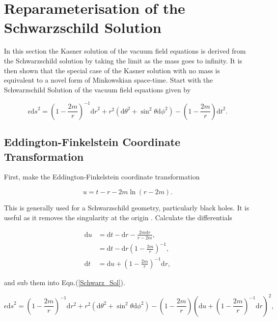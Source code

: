 \section{Reparameterisation of the Schwarzschild Solution}

In this section the Kasner solution of the vacuum field equations is derived from the Schwarzschild solution by taking the limit as the mass goes to infinity. It is then shown that the special case of the Kasner solution with no mass is equivalent to a novel form of Minkowskian space-time. Start with the Schwarzschild Solution of the vacuum field equations given by

\begin{equation}\label{Schwarz_Sol} 
\epsilon {\mathrm{d}s}^2 = {\left(1 - \frac{2m}{r}\right)}^{-1} {\mathrm{d}r}^{2} + r^2 ({\mathrm{d}\theta}^2 + {{\sin}^2 \theta}{\mathrm{d} \phi}^2) - \left(1 - \frac{2m}{r}\right) {\mathrm{d}t}^2.
\end{equation}

\subsection{Eddington-Finkelstein Coordinate Transformation}\label{Ed_Finkel_section}

\noindent First, make the Eddington-Finkelstein coordinate transformation

\begin{equation}\label{Ed-Fin_trans}
u = t - r - 2m \ln(r - 2m).
\end{equation}

\noindent This is generally used for a Schwarzschild geometry, particularly black holes. It is useful as it removes the singularity at the origin \cite{Finkelstein_Paper}. Calculate the differentials

\begin{align*}
\mathrm{d}u & = \mathrm{d}t - \mathrm{d}r - \frac{2m \mathrm{d}r}{r - 2m},\\
            & = \mathrm{d}t - \mathrm{d}r{\left( 1-\frac{2m}{r}  \right)}^{-1},\\
\mathrm{d}t & = \mathrm{d}u + {\left( 1-\frac{2m}{r}  \right)}^{-1} \mathrm{d}r, 
\end{align*}

\noindent and sub them into Eqn.(\ref{Schwarz_Sol}).

\begin{equation*}
\epsilon {\mathrm{d}s}^{2} = {\left( 1-\frac{2m}{r}  \right)}^{-1} \mathrm{d}r^2 + r^2 ({\mathrm{d}\theta}^2 + {{\sin}^2 \theta}{\mathrm{d} \phi}^2) - {\left( 1-\frac{2m}{r}  \right)} {\left( \mathrm{d}u + {\left( 1-\frac{2m}{r}  \right)}^{-1} \mathrm{d}r \right)}^{2},
\end{equation*}


